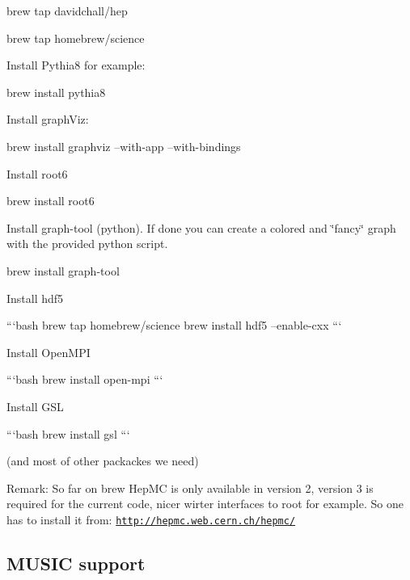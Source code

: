 brew tap davidchall/hep

brew tap homebrew/science


\begin{DoxyItemize}
\item Install Pythia8 for example\+:
\end{DoxyItemize}

brew install pythia8


\begin{DoxyItemize}
\item Install graph\+Viz\+:
\end{DoxyItemize}

brew install graphviz --with-\/app --with-\/bindings


\begin{DoxyItemize}
\item Install root6
\end{DoxyItemize}

brew install root6


\begin{DoxyItemize}
\item Install graph-\/tool (python). If done you can create a colored and \char`\"{}fancy\char`\"{} graph with the provided python script.
\end{DoxyItemize}

brew install graph-\/tool


\begin{DoxyItemize}
\item Install hdf5

```bash brew tap homebrew/science brew install hdf5 --enable-\/cxx ```
\item Install Open\+M\+PI

```bash brew install open-\/mpi ```
\item Install G\+SL

```bash brew install gsl ```
\end{DoxyItemize}

(and most of other packackes we need)

Remark\+: So far on brew Hep\+MC is only available in version 2, version 3 is required for the current code, nicer wirter interfaces to root for example. So one has to install it from\+: \href{http://hepmc.web.cern.ch/hepmc/}{\tt http\+://hepmc.\+web.\+cern.\+ch/hepmc/}

\subsection*{M\+U\+S\+IC support}

